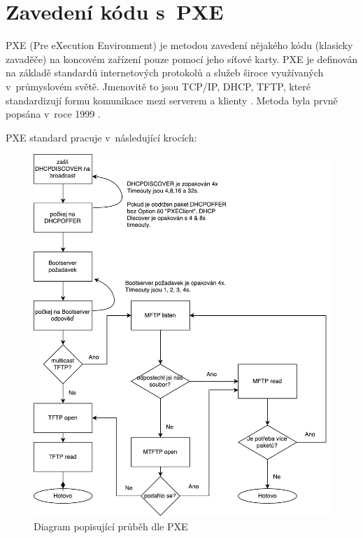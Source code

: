 \section{Zavedení kódu s~PXE}

PXE (Pre eXecution Environment) je metodou zavedení nějakého kódu (klasicky zavaděče) na koncovém zařízení pouze pomocí jeho síťové karty. PXE je definován na základě standardů internetových protokolů a služeb široce využívaných v~průmyslovém světě. Jmenovitě to jsou TCP/IP, DHCP, TFTP, které standardizují formu komunikace mezi serverem a klienty\cite{bootp-rfc} \cite{tftp-rfc}. Metoda byla prvně popsána v~roce 1999 \cite{pxe-spec}.

PXE standard pracuje v~následující krocích:

\begin{figure}[h]\centering
\includegraphics[width=1\textwidth]{files/pxe-flow.pdf}
	\caption{Diagram popisující průběh dle PXE}\label{fig:float}
\end{figure}

